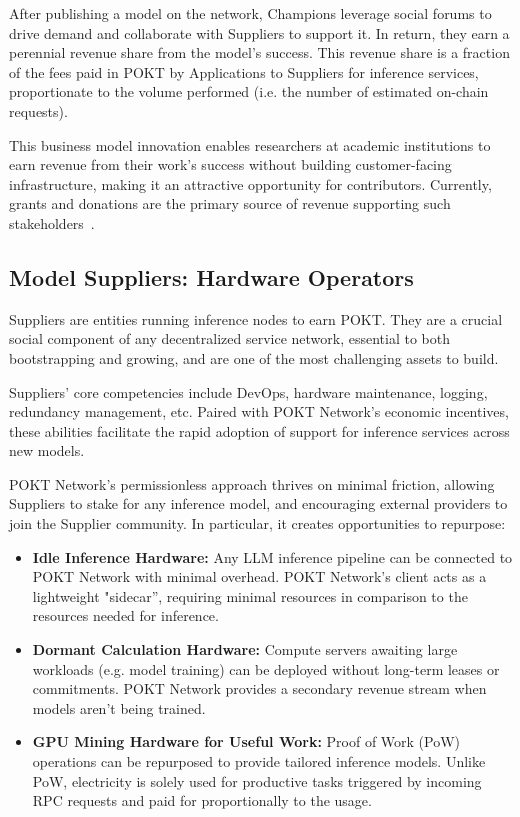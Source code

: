 \documentclass[conference,compsoc]{IEEEtran}
\begin{document}
After publishing a model on the network, Champions leverage social forums to drive demand and collaborate with Suppliers to support it. In return, they earn a perennial revenue share from the model's success. This revenue share is a fraction of the fees paid in POKT by Applications to Suppliers for inference services, proportionate to the volume performed (i.e. the number of estimated on-chain requests).

This business model innovation enables researchers at academic institutions to earn revenue from their work's success without building customer-facing infrastructure, making it an attractive opportunity for contributors. Currently, grants and donations are the primary source of revenue supporting such stakeholders~\cite{lmsysDonationsLMSYS}.

\subsection{Model Suppliers: Hardware Operators}

Suppliers are entities running inference nodes to earn POKT. They are a crucial social component of any decentralized service network, essential to both bootstrapping and growing, and are one of the most challenging assets to build.

Suppliers' core competencies include DevOps, hardware maintenance, logging, redundancy management, etc. Paired with POKT Network’s economic incentives, these abilities facilitate the rapid adoption of support for inference services across new models.

POKT Network's permissionless approach thrives on minimal friction, allowing Suppliers to stake for any inference model, and encouraging external providers to join the Supplier community. In particular, it creates opportunities to repurpose:

\begin{itemize}
    \item \textbf{Idle Inference Hardware:} Any LLM inference pipeline can be connected to POKT Network with minimal overhead. POKT Network's client acts as a lightweight "sidecar”, requiring minimal resources in comparison to the resources needed for inference.
    \item \textbf{Dormant Calculation Hardware:} Compute servers awaiting large workloads (e.g. model training) can be deployed without long-term leases or commitments. POKT Network provides a secondary revenue stream when models aren't being trained.
    \item \textbf{GPU Mining Hardware for Useful Work:} Proof of Work (PoW) operations can be repurposed to provide tailored inference models. Unlike PoW, electricity is solely used for productive tasks triggered by incoming RPC requests and paid for proportionally to the usage.
\end{itemize}
\end{document}
